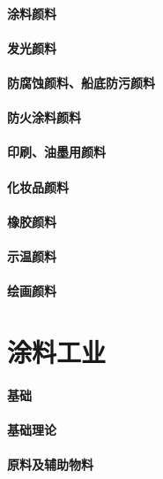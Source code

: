 \documentclass[UTF8]{../../ApplicationUniverse}
\begin{document}
    \subsubsection{涂料颜料}
    \subsubsection{发光颜料}
    \subsubsection{防腐蚀颜料、船底防污颜料}
    \subsubsection{防火涂料颜料}
    \subsubsection{印刷、油墨用颜料}
    \subsubsection{化妆品颜料}
    \subsubsection{橡胶颜料}
    \subsubsection{示温颜料}
    \subsubsection{绘画颜料}








\chapter{涂料工业}
\subsubsection{基础}
    \subsubsection{基础理论}
    \subsubsection{原料及辅助物料}
\end{document}
